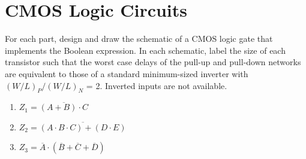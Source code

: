 \documentclass{article}
\begin{document}
\section*{CMOS Logic Circuits}
For each part, design and draw the schematic of a CMOS logic gate that implements the Boolean expression. In each schematic, label the size of each transistor such that the worst case delays of the pull-up and pull-down networks are equivalent to those of a standard minimum-sized inverter with $(W/L)_P/(W/L)_N$ = 2.  Inverted inputs are not available.
\begin{enumerate}[label=(\alph*)]
    \item $Z_1 = \overline{(A+B) \cdot C}$
    \item $Z_2 = \overline{(A \cdot B \cdot C) + (D \cdot E)}$
    \item $Z_3 = \overline{A} \cdot (\overline{B} + \overline{C} + \overline{D})$
\end{enumerate}
\newpage
\end{document}
